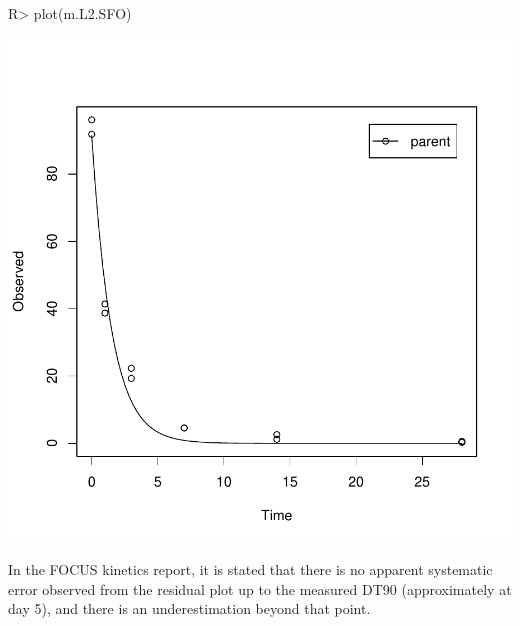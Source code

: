 \documentclass[12pt,a4paper]{article}
\begin{document}
\begin{Schunk}
\begin{Sinput}
R> plot(m.L2.SFO)
\end{Sinput}
\end{Schunk}
\includegraphics{examples-L2_SFO_plot}

In the FOCUS kinetics report, it is stated that there is no apparent systematic
error observed from the residual plot up to the measured DT90 (approximately at
day 5), and there is an underestimation beyond that point.
\end{document}
